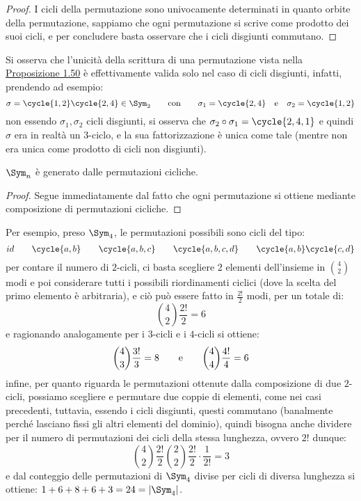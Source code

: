 \documentclass[11pt]{scrartcl}
\begin{document}
\begin{proof}
    I cicli della permutazione sono univocamente determinati in quanto orbite della permutazione, sappiamo che ogni permutazione si scrive come prodotto dei suoi cicli,
    e per concludere basta osservare che i cicli disgiunti commutano.
\end{proof}

\begin{remark}
    Si osserva che l'unicità della scrittura di una permutazione vista nella \hyperref[perm]{Proposizione 1.50} è effettivamente valida solo nel caso di cicli disgiunti, infatti, prendendo ad esempio:
        \[ \sigma = \cycle{1,2}\cycle{2,4} \in \Sym_2 \qquad \text{con}\qquad \sigma_1 = \cycle{2,4} \quad \text e \quad \sigma_2 = \cycle{1,2}
            \]
    non essendo $\sigma_1,\sigma_2$ cicli disgiunti, si osserva che $\sigma_2 \circ \sigma_1 = \cycle{2,4,1}$ e quindi $\sigma$ era in realtà un $3$-ciclo, e la sua fattorizzazione è unica come tale 
    (mentre non era unica come prodotto di cicli non disgiunti). 
\end{remark}

\pagebreak

\begin{corollary}
    $\Sym_n$ è generato dalle permutazioni cicliche.
\end{corollary}

\begin{proof}
    Segue immediatamente dal fatto che ogni permutazione si ottiene mediante composizione di permutazioni cicliche. 
\end{proof}

\begin{example}
    Per esempio, preso $\Sym_4$, le permutazioni possibili sono cicli del tipo:
        \[ id \qquad \cycle{a,b} \qquad \cycle{a,b,c} \qquad \cycle{a,b,c,d} \qquad \cycle{a,b}\cycle{c,d}
            \]
    per contare il numero di $2$-cicli, ci basta scegliere $2$ elementi dell'insieme in $\binom{4}{2}$ modi e poi considerare tutti i possibili 
    riordinamenti ciclici (dove la scelta del primo elemento è arbitraria), e ciò può essere fatto in $\frac{2!}{2}$ modi, per un totale di:
        \[ \binom{4}{2}\frac{2!}{2} = 6
            \]
    e ragionando analogamente per i $3$-cicli e i $4$-cicli si ottiene:
        \[ \binom{4}{3}\frac{3!}{3} = 8 \qquad \text e \qquad \binom{4}{4}\frac{4!}{4} = 6
            \]
    infine, per quanto riguarda le permutazioni ottenute dalla composizione di due $2$-cicli, possiamo scegliere e permutare due coppie di elementi, come 
    nei casi precedenti, tuttavia, essendo i cicli disgiunti, questi commutano (banalmente perché lasciano fissi gli altri elementi del dominio), quindi bisogna anche 
    dividere per il numero di permutazioni dei cicli della stessa lunghezza, ovvero $2!$ dunque:
        \[ \binom{4}{2}\frac{2!}{2}\binom{2}{2}\frac{2!}{2} \cdot \frac{1}{2!} = 3
            \]
    e dal conteggio delle permutazioni di $\Sym_4$ divise per cicli di diversa lunghezza si ottiene: $1+6+8+6+3 = 24 = |\Sym_4|$.
\end{example}
\end{document}
